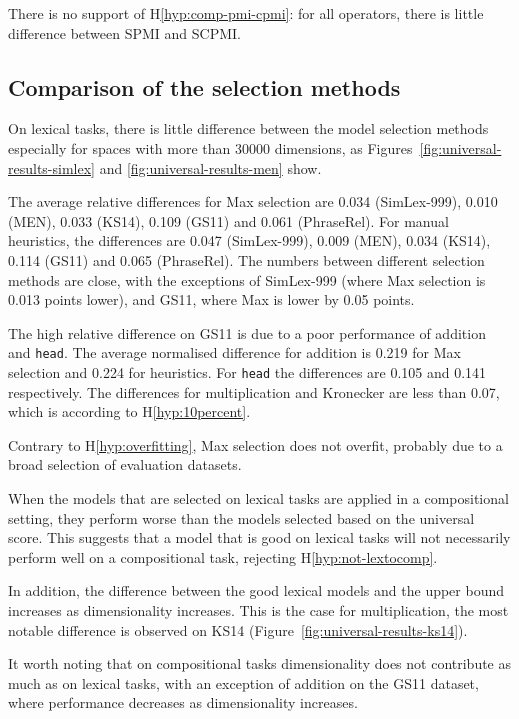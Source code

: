 There is no support of H\ref{hyp:comp-pmi-cpmi}: for all operators, there is little difference between SPMI and SCPMI.

\subsection{Comparison of the selection methods}
\label{sec:comparison-universal}

On lexical tasks, there is little difference between the model selection methods especially for spaces with more than 30000 dimensions, as Figures~\ref{fig:universal-results-simlex} and \ref{fig:universal-results-men} show.

The average relative differences for Max selection are 0.034 (SimLex-999), 0.010 (MEN), 0.033 (KS14), 0.109 (GS11) and 0.061 (PhraseRel). For manual heuristics, the differences are 0.047 (SimLex-999), 0.009 (MEN), 0.034 (KS14), 0.114 (GS11) and 0.065 (PhraseRel). The numbers between different selection methods are close, with the exceptions of SimLex-999 (where Max selection is 0.013 points lower), and GS11, where Max is lower by 0.05 points.

The high relative difference on GS11 is due to a poor performance of addition and \texttt{head}. The average normalised difference for addition is 0.219 for Max selection and 0.224 for heuristics. For \texttt{head} the differences are 0.105 and 0.141 respectively. The differences for multiplication and Kronecker are less than 0.07, which is according to H\ref{hyp:10percent}.

Contrary to H\ref{hyp:overfitting}, Max selection does not overfit, probably due to a broad selection of evaluation datasets.

When the models that are selected on lexical tasks are applied in a compositional setting, they perform worse than the models selected based on the universal score. This suggests that a model that is good on lexical tasks will not necessarily perform well on a compositional task, rejecting H\ref{hyp:not-lextocomp}.

In addition, the difference between the good lexical models and the upper bound increases as dimensionality increases. This is the case for multiplication, the most notable difference is observed on KS14 (Figure~\ref{fig:universal-results-ks14}).

It worth noting that on compositional tasks dimensionality does not contribute as much as on lexical tasks, with an exception of addition on the GS11 dataset, where performance decreases as dimensionality increases.

